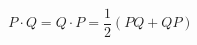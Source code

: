 \begin{equation}
         P\cdot Q = Q\cdot P =\frac{1}{2}(P Q + Q P)     \label{eq:bir}                   
\end{equation}


